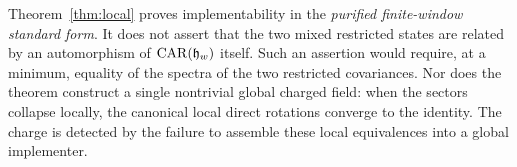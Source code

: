 \begin{remark}
Theorem~\ref{thm:local} proves implementability in the
\emph{purified finite-window standard form}.  It does not assert that the
two mixed restricted states are related by an automorphism of
$\operatorname{CAR}(\mathfrak h_w)$ itself.  Such an assertion would require, at a
minimum, equality of the spectra of the two restricted covariances.
Nor does the theorem construct a single nontrivial global charged field:
when the sectors collapse locally, the canonical local direct rotations
converge to the identity.  The charge is detected by the failure to
assemble these local equivalences into a global implementer.
\end{remark}

